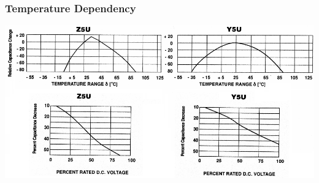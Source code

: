 \documentclass{beamer}
\begin{document}
	\begin{frame}
    \frametitle{Temperature Dependency}
		\begin{center}
			\includegraphics[scale=0.4]{obr10_tepZav.png}
		\end{center}
  \end{frame}
	
\end{document}
